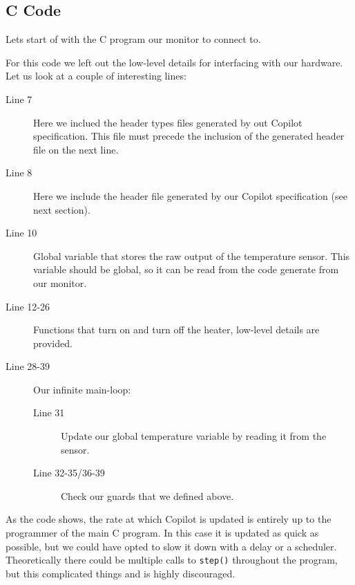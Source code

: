 \subsection{C Code}
Lets start of with the C program our monitor to connect to.


%
%
%
%
%
%
%

For this code we left out the low-level details for interfacing with our
hardware. Let us look at a couple of interesting lines:

\begin{description}
  \item[Line 7] Here we inclued the header types files generated by out Copilot
  specification. This file must precede the inclusion of the generated header
  file on the next line. 
  \item[Line 8] Here we include the header file generated by our Copilot
  specification (see next section).
  \item[Line 10] Global variable that stores the raw output of the temperature
  sensor. This variable should be global, so it can be read from the code
  generate from our monitor.
  \item[Line 12-26] Functions that turn on and turn off the
  heater, low-level details are provided.
  \item[Line 28-39] Our infinite main-loop:
    \begin{description}
      \item[Line 31] Update our global temperature variable by reading it from
      the sensor.
      \item[Line 32-35/36-39] Check our guards that we defined above.
    \end{description}
\end{description}

As the code shows, the rate at which Copilot is updated is entirely up to the
programmer of the main C program. In this case it is updated as quick as
possible, but we could have opted to slow it down with a delay or a scheduler.
Theoretically there could be multiple calls to \texttt{step()} throughout the
program, but this complicated things and is highly discouraged.


